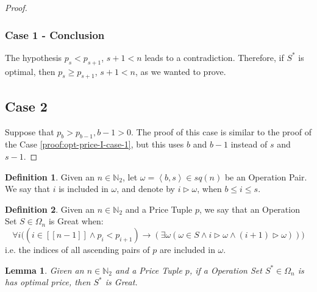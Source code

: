 \documentclass{article}
\newcommand{\N}{\mathbb{N}}
\newcommand{\Nb}[1]{\ensuremath{\N_{#1}}}
\newcommand{\Nt}{\Nb{2}}
\newcommand{\range}[1]{\ensuremath{\left[\left[ #1 \right]\right]}}
\newcommand{\Square}[1]{\ensuremath{sq({#1})}}
\newcommand{\tuple}[1]{\ensuremath{\left\langle #1 \right\rangle}}
\newcommand{\incl}[2]{#1 \triangleright #2}
\newcommand{\great}{Great\xspace}
\newcommand{\op}{\ensuremath{\omega}}
\newcommand{\OS}{\ensuremath{\Omega_{n}}}
\newcommand{\sopt}{\ensuremath{S^{*}}}
\theoremstyle{definition}
\newtheorem{defn}{Definition}
\theoremstyle{plain}
\newtheorem{lemma}{Lemma}
\begin{document}
\begin{proof}
    \subsubsection*{Case 1 - Conclusion}
    The hypothesis $p_s < p_{s+1}$, $s+1 < n$ leads to a contradiction. Therefore, if $\sopt$ is optimal, then $p_s \geqslant p_{s+1}$, $s+1 < n$, as we wanted to prove.

    \subsection*{Case 2}
    Suppose that $p_b > p_{b-1}, b-1 > 0$. The proof of this case is similar to the proof of the Case \ref{proof:opt-price-I-case-1}, but this uses $b$ and $b-1$ instead of $s$ and $s-1$.
\end{proof}

\begin{defn}
    Given an $n \in \Nt$, let $\op = \tuple{b, s} \in \Square{n}$ be an Operation Pair. We say that $i$ is included in $\op$, and denote by $\incl{i}{\op}$, when $b \leqslant i \leqslant s$.
\end{defn}

\begin{defn}
    Given an $n \in \Nt$ and a Price Tuple $p$, we say that an Operation Set $S \in \OS$ is \great when:
    \begin{equation}
        \forall i \big(
            \left( i \in \range{n-1} \land p_{i} < p_{i+1}  \right)
            \rightarrow
            \left( \exists \op \left(
                \op \in S \land i \triangleright \op \land (i+1) \triangleright \op
            \right) \right)
        \big)
    \end{equation}
    i.e. the indices of all ascending pairs of $p$ are included in $\op$.
\end{defn}

\begin{lemma}
    \label{lemma:opt-price-II}
    Given an $n \in \Nt$ and a Price Tuple $p$, if a Operation Set $\sopt \in \OS$ is has optimal price, then $\sopt$ is \great.
\end{lemma}
\end{document}
